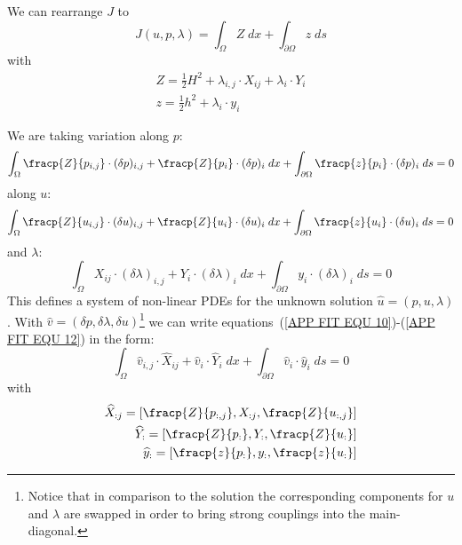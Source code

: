 We can rearrange $J$ to 
\begin{equation}\label{APP FIT EQU 5}
J(u,p,\lambda) = \int_{\Omega} Z \; dx 
+  \int_{\partial \Omega} z \; ds
\end{equation}
with 
\begin{align}\label{APP FIT EQU 6}
 Z = \frac{1}{2}  H^2 + \lambda_{i,j} \cdot X_{ij} +  \lambda_{i} \cdot Y_{i} \\
z=\frac{1}{2} h^2 + \lambda_{i} \cdot y_{i} 
\end{align}

We are taking variation along $p$:
\begin{equation}\label{APP FIT EQU 10}
\int_{\Omega} \fracp{Z}{p_{i,j}}  \cdot  (\delta p)_{i,j} + \fracp{Z}{p_{i}} \cdot  (\delta p)_{i}
\; dx +  \int_{\partial \Omega} \fracp{z}{p_{i}}  \cdot  (\delta p)_{i} \; ds =0
\end{equation}
along $u$:
\begin{align}\label{APP FIT EQU 11}
\int_{\Omega} \fracp{Z}{u_{i,j}}  \cdot (\delta u)_{i,j} + \fracp{Z}{u_{i}} \cdot  (\delta u)_{i}
\; dx +  \int_{\partial \Omega} \fracp{z}{u_{i}}  \cdot  (\delta u)_{i} \; ds =0
\end{align}
and $\lambda$:
\begin{equation}\label{APP FIT EQU 12}
\int_{\Omega} X_{ij}  \cdot (\delta \lambda)_{i,j}  +  Y_{i}  \cdot (\delta \lambda)_{i}  \; dx
+ \int_{\partial \Omega}   y_{i}  \cdot  (\delta \lambda)_{i}  \; ds = 0
\end{equation}
This defines a system of non-linear PDEs for the unknown solution $\widehat{u} = (p,u,\lambda)$. With 
$\widehat{v} = (\delta p,\delta \lambda, \delta u)$\footnote{Notice that in comparison to the solution
the corresponding components for $u$ and $\lambda$ are swapped in order to bring strong couplings into the main-diagonal.}
we can write equations~(\ref{APP FIT EQU 10})-(\ref{APP FIT EQU 12}) in the form:
\begin{equation} \label{APP FIT EQU 13}
\int_{\Omega} \widehat{v}_{i,j} \cdot \widehat{X}_{ij} + \widehat{v}_{i} \cdot \widehat{Y}_{i} \; dx
+ \int_{\partial \Omega}  \widehat{v}_{i} \cdot \widehat{y}_{i} \; ds  = 0 
\end{equation}
with
\begin{align}\label{APP FIT EQU 15}
\widehat{X}_{:j} = \left[ \fracp{Z}{p_{:,j}}, X_{:j}, \fracp{Z}{u_{:,j}} \right] \\
\widehat{Y}_{:} = \left[ \fracp{Z}{p_{:}}, Y_{:}, \fracp{Z}{u_{:}} \right] \\
\widehat{y}_{:} = \left[ \fracp{z}{p_{:}}, y_{:}, \fracp{z}{u_{:}} \right] 
\end{align}
